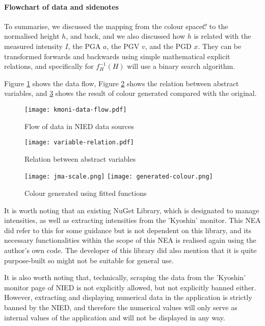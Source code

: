 \paragraph{Flowchart of data and sidenotes} To summarise, we discussed the mapping from the colour space\(\mathcal{C}\) to the normalised height \(h\), and back, and we also discussed how \(h\) is related with the measured intensity \(I\), the PGA \(a\), the PGV \(v\), and the PGD \(x\). They can be transformed forwards and backwards using simple mathematical explicit relations, and specifically for \(f_H^{-1}(H)\) will use a binary search algorithm.

Figure \ref{fig:kmoni-data-flow} shows the data flow, Figure \ref{fig:variable-relation} shows the relation between abstract variables, and \ref{fig:generated-colour} shows the result of colour generated compared with the original.

\begin{figure}[!ht]
    \centering
    \texttt{[image: kmoni-data-flow.pdf]}
    \caption{Flow of data in NIED data sources}
    \label{fig:kmoni-data-flow}
\end{figure}

\begin{figure}[!ht]
    \centering
    \texttt{[image: variable-relation.pdf]}
    \caption{Relation between abstract variables}
    \label{fig:variable-relation}
\end{figure}

\begin{figure}[!ht]
    \centering
    \texttt{[image: jma-scale.png]}
    \texttt{[image: generated-colour.png]}
    \caption{Colour generated using fitted functions}
    \label{fig:generated-colour}
\end{figure}

It is worth noting that an existing NuGet Library,  which is designated to manage intensities, as well as extracting intensities from the 'Kyoshin' monitor. This NEA did refer to this for some guidance but is not dependent on this library, and its necessary functionalities within the scope of this NEA is realised again using the author's own code. The developer of this library did also mention that it is quite purpose-built so might not be suitable for general use.

It is also worth noting that, technically, scraping the data from the 'Kyoshin' monitor page of NIED is not explicitly allowed, but not explicitly banned either. However, extracting and displaying numerical data in the application is strictly banned by the NIED, and therefore the numerical values will only serve as internal values of the application and will not be displayed in any way.

